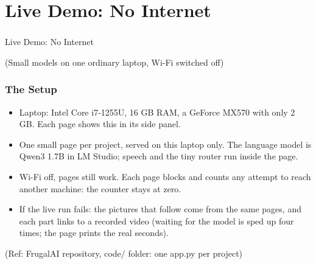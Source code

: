
\section[Demo]{Live Demo: No Internet}

\begin{frame}[fragile]\frametitle{}
\begin{center}
{\Large Live Demo: No Internet}

\medskip
{\small (Small models on one ordinary laptop, Wi-Fi switched off)}
\end{center}
\end{frame}

\begin{frame}[fragile]\frametitle{The Setup}
\begin{itemize}
\item Laptop: Intel Core i7-1255U, 16 GB RAM, a GeForce MX570 with only 2 GB. Each page shows this in its side panel.
\item One small page per project, served on this laptop only. The language model is Qwen3 1.7B in LM Studio; speech and the tiny router run inside the page.
\item Wi-Fi off, pages still work. Each page blocks and counts any attempt to reach another machine: the counter stays at zero.
\item If the live run fails: the pictures that follow come from the same pages, and each part links to a recorded video (waiting for the model is sped up four times; the page prints the real seconds).
\end{itemize}
{\tiny (Ref: FrugalAI repository, code/ folder: one app.py per project)}
\end{frame}

